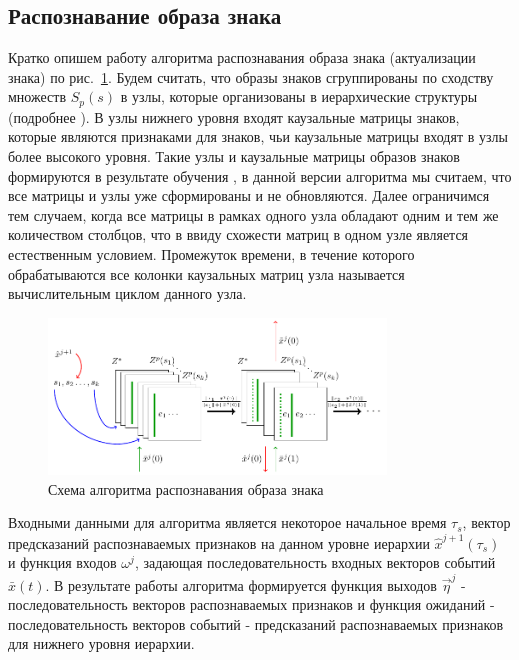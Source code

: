 \documentclass[12pt]{scrartcl}
\begin{document}
	\subsection{Распознавание образа знака}\label{subsec:actual}
	
	Кратко опишем работу алгоритма распознавания образа знака (актуализации знака) по рис.~\ref{fig:percept}. Будем считать, что образы знаков сгруппированы по сходству множеств $S_p(s)$ в узлы, которые организованы в иерархические структуры (подробнее \cite{Panov2014d}). В узлы нижнего уровня входят каузальные матрицы знаков, которые являются признаками для знаков, чьи каузальные матрицы входят в узлы более высокого уровня. Такие узлы и каузальные матрицы образов знаков формируются в результате обучения \cite{Panov2014d,Skrynnik2016}, в данной версии алгоритма мы считаем, что все матрицы и узлы уже сформированы и не обновляются. Далее ограничимся тем случаем, когда все матрицы в рамках одного узла обладают одним и тем же количеством столбцов, что в ввиду схожести матриц в одном узле является естественным условием. Промежуток времени, в течение которого обрабатываются все колонки каузальных матриц узла называется вычислительным циклом данного узла.
	
	\begin{figure}
		\centering
		\includegraphics[width=0.8\textwidth]{algo/perception}
		\caption{Схема алгоритма распознавания образа знака}
		\label{fig:percept}		
	\end{figure}

	Входными данными для алгоритма является некоторое начальное время $\tau_s$, вектор предсказаний распознаваемых признаков на данном уровне иерархии $\hat x^{j+1}(\tau_s)$ и функция входов $\omega^j$, задающая последовательность входных векторов событий $\bar x(t)$. В результате работы алгоритма формируется функция выходов $\vec \eta^j$ - последовательность векторов распознаваемых признаков и функция ожиданий - последовательность векторов событий - предсказаний распознаваемых признаков для нижнего уровня иерархии.
\end{document}

